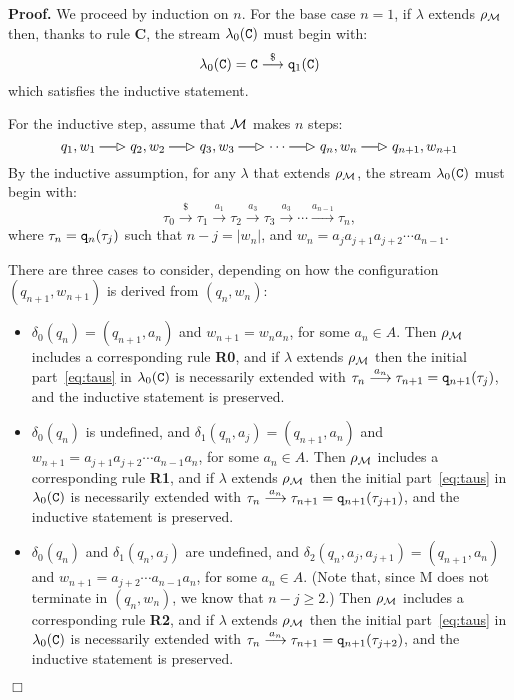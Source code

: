 \documentclass[adraft,copyright,creativecommons]{eptcs}
\newenvironment{proof}[1][Proof]{\noindent\textbf{#1.} }{{\hfill $\Box$ \\}}
\newcommand{\goes}[1]{\stackrel{#1}{\longrightarrow}}
\newcommand{\abstractgoes}[2]{\setbox0=\hbox{\ ${\scriptstyle#2}$\ }
\ifdim\wd0<12pt\wd0=12pt\fi
\mathrel{\stackrel{#2}{\rule[2.2pt]{\wd0}{0.6pt}}\mkern-6mu{#1}}}
\newcommand{\mqmgoes}[1]{\abstractgoes{\rhd}{#1}}
\begin{document}
\begin{proof}
We proceed by induction on $n$. For the base case $n=1$, if $\lambda$ extends $\rho_{\cal M}$ then, thanks to rule {\bf C}, the stream $\lambda_0({\tt C})$ must begin with:
\[
\lambda_0({\tt C})={\tt C}\goes{\$}{\tt q}_1({\tt C})
\]
which satisfies the inductive statement.

For the inductive step, assume that ${\cal M}$ makes $n$ steps:
\[
	q_1,w_1 \mqmgoes{} q_2,w_2 \mqmgoes{} q_3,w_3 \mqmgoes{}\cdots\mqmgoes{}q_n,w_n\mqmgoes{}q_{n+1},w_{n+1}
\]
By the inductive assumption, for any $\lambda$ that extends $\rho_{\cal M}$, the stream $\lambda_0({\tt C})$ must begin with:
\begin{equation}\label{eq:taus}
	\tau_0\goes{\$}\tau_1\goes{a_1}\tau_2\goes{a_3}\tau_3\goes{a_3}\cdots\goes{a_{n-1}}\tau_n,
\end{equation}
where $\tau_n={\tt q}_n(\tau_j)$ such that $n-j=|w_n|$, and $w_n=a_ja_{j+1}a_{j+2}\cdots{a_{n-1}}$.

There are three cases to consider, depending on how the configuration $(q_{n+1},w_{n+1})$ is derived from $(q_n,w_n)$:
\begin{itemize}
\item $\delta_0(q_n)=(q_{n+1},a_n)$ and $w_{n+1}=w_na_n$, for some $a_n\in A$. Then $\rho_{\cal M}$ includes a corresponding rule {\bf R0}, and if $\lambda$ extends $\rho_{\cal M}$ then the initial part~\eqref{eq:taus} in $\lambda_0({\tt C})$ is necessarily extended with $\tau_n\goes{a_n}\tau_{n+1}={\tt q}_{n+1}(\tau_{j})$, and the inductive statement is preserved.
\item $\delta_0(q_n)$ is undefined, and $\delta_1(q_n,a_j)=(q_{n+1},a_n)$ and $w_{n+1}=a_{j+1}a_{j+2}\cdots a_{n-1}a_n$, for some $a_n\in A$. Then $\rho_{\cal M}$ includes a corresponding rule {\bf R1}, and if $\lambda$ extends $\rho_{\cal M}$ then the initial part~\eqref{eq:taus} in $\lambda_0({\tt C})$ is necessarily extended with $\tau_n\goes{a_n}\tau_{n+1}={\tt q}_{n+1}(\tau_{j+1})$, and the inductive statement is preserved.
\item $\delta_0(q_n)$ and $\delta_1(q_n,a_j)$ are undefined, and $\delta_2(q_n,a_j,a_{j+1})=(q_{n+1},a_n)$ and $w_{n+1}=a_{j+2}\cdots a_{n-1}a_n$, for some $a_n\in A$. (Note that, since {\cal M} does not terminate in $(q_n,w_n)$, we know that $n-j\geq 2$.) Then $\rho_{\cal M}$ includes a corresponding rule {\bf R2}, and if $\lambda$ extends $\rho_{\cal M}$ then the initial part~\eqref{eq:taus} in $\lambda_0({\tt C})$ is necessarily extended with $\tau_n\goes{a_n}\tau_{n+1}={\tt q}_{n+1}(\tau_{j+2})$, and the inductive statement is preserved.
\end{itemize}


\end{proof}
\end{document}

